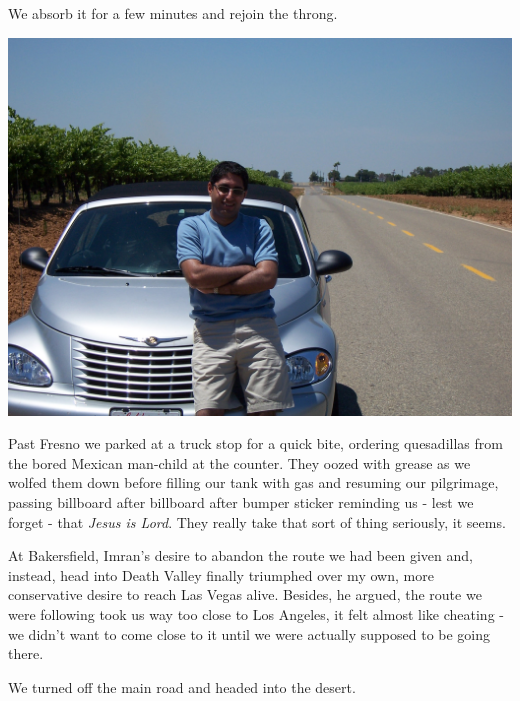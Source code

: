 \documentclass[a5paper,titlepage,11pt]{book}
\begin{document}
We absorb it for a few minutes and rejoin the throng.

\begin{center}\includegraphics[width=\textwidth]{gfx/100_1307}\end{center}

Past Fresno we parked at a truck stop for a quick bite, ordering quesadillas from the bored Mexican man-child at the counter.  They oozed with grease as we wolfed them down before filling our tank with gas and resuming our pilgrimage, passing billboard after billboard after bumper sticker reminding us - lest we forget - that \emph{Jesus is Lord}.  They really take that sort of thing seriously, it seems.

At Bakersfield, Imran's desire to abandon the route we had been given and, instead, head into Death Valley finally triumphed over my own, more conservative desire to reach Las Vegas alive.  Besides, he argued, the route we were following took us way too close to Los Angeles, it felt almost like cheating - we didn't want to come close to it until we were actually supposed to be going there.

We turned off the main road and headed into the desert.
\end{document}
